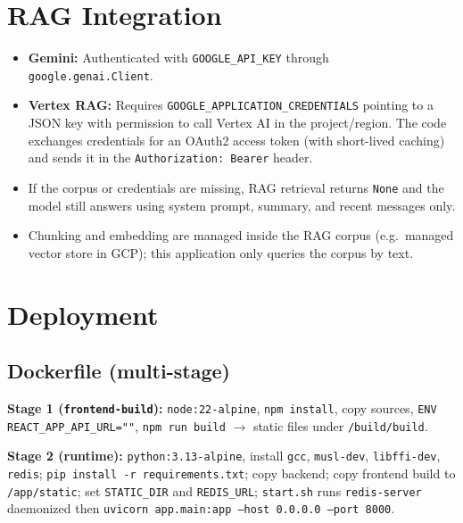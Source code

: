 \documentclass[11pt,a4paper]{article}
\begin{document}
\section{RAG Integration}

\begin{itemize}[noitemsep]
  \item \textbf{Gemini:} Authenticated with \texttt{GOOGLE\_API\_KEY} through \texttt{google.genai.Client}.
  \item \textbf{Vertex RAG:} Requires \texttt{GOOGLE\_APPLICATION\_CREDENTIALS} pointing to a JSON key with permission to call Vertex AI in the project/region. The code exchanges credentials for an OAuth2 access token (with short-lived caching) and sends it in the \texttt{Authorization: Bearer} header.
  \item If the corpus or credentials are missing, RAG retrieval returns \texttt{None} and the model still answers using system prompt, summary, and recent messages only.
  \item Chunking and embedding are managed inside the RAG corpus (e.g.\ managed vector store in GCP); this application only queries the corpus by text.
\end{itemize}

\section{Deployment}

\subsection{Dockerfile (multi-stage)}

\textbf{Stage 1 (\texttt{frontend-build}):} \texttt{node:22-alpine}, \texttt{npm install}, copy sources, \texttt{ENV REACT\_APP\_API\_URL=""}, \texttt{npm run build} $\rightarrow$ static files under \texttt{/build/build}.

\textbf{Stage 2 (runtime):} \texttt{python:3.13-alpine}, install \texttt{gcc}, \texttt{musl-dev}, \texttt{libffi-dev}, \texttt{redis}; \texttt{pip install -r requirements.txt}; copy backend; copy frontend build to \texttt{/app/static}; set \texttt{STATIC\_DIR} and \texttt{REDIS\_URL}; \texttt{start.sh} runs \texttt{redis-server} daemonized then \texttt{uvicorn app.main:app --host 0.0.0.0 --port 8000}.
\end{document}
